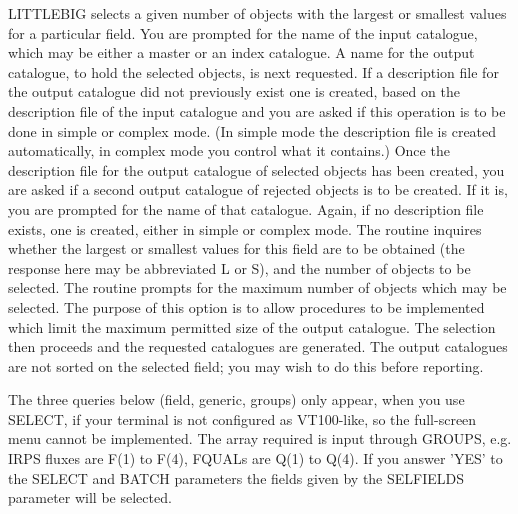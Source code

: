 LITTLEBIG selects a given number of objects with the largest or smallest 
values for a particular field.
You are prompted for the name of the input catalogue,
which may be either a master or an index catalogue. 
A name for the output catalogue, to hold the selected objects, is next 
requested.
If a description file for the output catalogue did not previously exist
one is created, based on the description file of the input
catalogue and you are asked if this operation is to be done
in simple or complex mode. 
(In simple mode the description file is created automatically, in complex 
mode you control what it contains.)
Once the description file for the output catalogue of selected
objects has been created, you are asked if a second output
catalogue of rejected objects is to be created. 
If it is, you are prompted for the name of that catalogue. 
Again, if no description file exists, one is created, either in simple or
complex mode. 
The routine inquires whether the largest or smallest values for this field 
are to be obtained (the response here may be abbreviated L or S), and the
number of objects to be selected.
The routine prompts for the maximum number of objects which may be 
selected. 
The purpose of this option is to allow procedures to be implemented which 
limit the maximum permitted size of the output catalogue.
The selection then proceeds and the requested catalogues are generated.  
The output catalogues are not sorted on the selected field; you may wish 
to do this before reporting.

The three queries below (field, generic, groups) only appear, when you use
SELECT, if your terminal is not configured as VT100-like, so the full-screen 
menu cannot be implemented.
The array required is input through GROUPS, e.g. IRPS fluxes are F(1) to 
F(4), FQUALs are Q(1) to Q(4).
If you answer 'YES' to the SELECT and BATCH parameters the fields given by the
SELFIELDS parameter will be selected.

